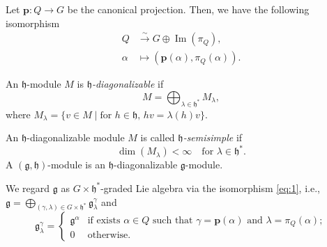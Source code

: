 \documentclass{beamer}
\DeclareMathOperator{\Ima}{Im}
\begin{document}
\begin{frame}
  Let $\mathbf{p}: Q \to G$ be the canonical projection.
  Then, we have the following isomorphism
  \begin{equation}
    \label{eq:1}
    \begin{split}
      Q &\xrightarrow{\sim} G \oplus \Ima(\pi_Q), \\
      \alpha &\mapsto (\mathbf{p}(\alpha), \pi_Q(\alpha)).
    \end{split}
  \end{equation}

  An $\mathfrak{h}$-module $M$ is \emph{$\mathfrak{h}$-diagonalizable} if
  \begin{equation*}
    M = \bigoplus_{\lambda \in \mathfrak{h}^*}M_{\lambda},
  \end{equation*}
  where $M_{\lambda} = \{v \in M \mid \text{for $h \in \mathfrak{h}$, $hv = \lambda(h)v$}\}$.

  An $\mathfrak{h}$-diagonalizable module $M$ is called \emph{$\mathfrak{h}$-semisimple} if
  \begin{equation*}
    \dim(M_{\lambda}) < \infty \quad \text{for $\lambda \in \mathfrak{h}^*$}.
  \end{equation*}
  A $(\mathfrak{g}, \mathfrak{h})$-module is an $\mathfrak{h}$-diagonalizable $\mathfrak{g}$-module.

  We regard $\mathfrak{g}$ as $G \times \mathfrak{h}^*$-graded Lie algebra via the isomorphism \eqref{eq:1}, i.e., $\mathfrak{g} = \bigoplus_{(\gamma, \lambda) \in G \times \mathfrak{h}^*}\mathfrak{g}^{\gamma}_{\lambda}$ and
  \begin{equation*}
    \mathfrak{g}^{\gamma}_{\lambda} =
    \begin{cases}
      \mathfrak{g}^{\alpha} &\text{if exists $\alpha \in Q$ such that $\gamma = \mathbf{p}(\alpha)$ and $\lambda = \pi_Q(\alpha)$}; \\
      0 &\text{otherwise}.
    \end{cases}
  \end{equation*}
\end{frame}
\end{document}
